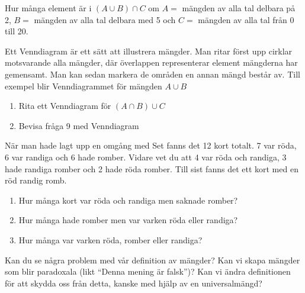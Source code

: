\begin{problem}[Extra]
	Hur många element är i \((A \cup B) \cap C\) om \(A =\) mängden av alla tal delbara på 2, \(B = \) mängden av alla tal delbara med 5 och \(C =\) mängden av alla tal från 0 till 20.
\end{problem}

\begin{problem}[Extra]
	Ett Venndiagram är ett sätt att illustrera mängder. Man ritar först upp cirklar motsvarande alla mängder, där överlappen representerar element mängderna har gemensamt. Man kan sedan markera de områden en annan mängd består av. Till exempel blir Venndiagrammet för mängden \(A \cup B\) 
	\def\firstcircle{(0,0) circle (1.5cm)}
	\def\secondcircle{(60:2cm) circle (1.5cm)}
	\def\thirdcircle{(0:2cm) circle (1.5cm)}
	\begin{center}
	\end{center}

	\noindent
	\begin{enumerate}[label=\alph*)]
		\item Rita ett Venndiagram för \((A \cap B) \cup C \)
		\item Bevisa fråga 9 med Venndiagram
	\end{enumerate}
\end{problem}

\begin{problem}
	När man hade lagt upp en omgång med Set fanns det 12 kort totalt. 7 var röda, 6 var randiga och 6 hade romber. Vidare vet du att 4 var röda och randiga, 3 hade randiga romber och 2 hade röda romber. Till sist fanns det ett kort med en röd randig romb.
	\begin{enumerate}[label=\alph*)]
		\item Hur många kort var röda och randiga men saknade romber?
		\item Hur många hade romber men var varken röda eller randiga?
		\item Hur många var varken röda, romber eller randiga?
	\end{enumerate}
\end{problem}

\begin{problem}
	Kan du se några problem med vår definition av mängder? Kan vi skapa mängder som blir paradoxala (likt ``Denna mening är falsk'')? Kan vi ändra definitionen för att skydda oss från detta, kanske med hjälp av en universalmängd?
\end{problem}

